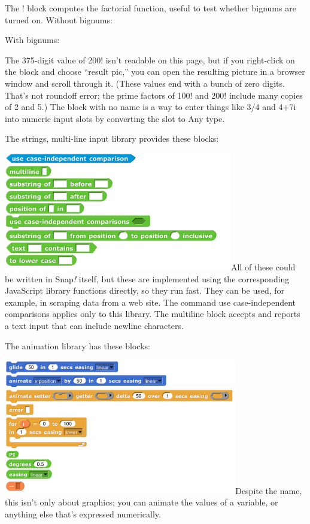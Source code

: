 The ! block computes the factorial function, useful to test whether
bignums are turned on. Without bignums:

With bignums:

The 375-digit value of 200! isn't readable on this page, but if you
right-click on the block and choose ``result pic,'' you can open the
resulting picture in a browser window and scroll through it. (These
values end with a bunch of zero digits. That's not roundoff error; the
prime factors of 100! and 200! include many copies of 2 and 5.) The
block with no name is a way to enter things like 3/4 and 4+7i into
numeric input slots by converting the slot to Any type.

The strings, multi-line input library provides these blocks:

\includegraphics[width=3.9375in,height=2.04167in]{media/image463.png}All
of these could be written in Snap\emph{!} itself, but these are
implemented using the corresponding JavaScript library functions
directly, so they run fast. They can be used, for example, in scraping
data from a web site. The command use case-independent comparisons
applies only to this library. The multiline block accepts and reports a
text input that can include newline characters.

The animation library has these blocks:

\includegraphics[width=4.0125in,height=2.33125in]{media/image464.png}Despite
the name, this isn't only about graphics; you can animate the values of
a variable, or anything else that's expressed numerically.

